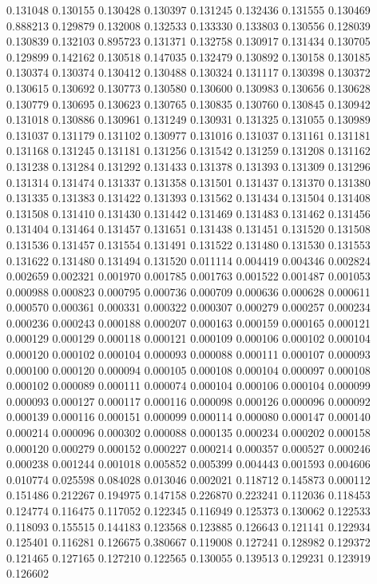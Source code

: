 0.131048
0.130155
0.130428
0.130397
0.131245
0.132436
0.131555
0.130469
0.888213
0.129879
0.132008
0.132533
0.133330
0.133803
0.130556
0.128039
0.130839
0.132103
0.895723
0.131371
0.132758
0.130917
0.131434
0.130705
0.129899
0.142162
0.130518
0.147035
0.132479
0.130892
0.130158
0.130185
0.130374
0.130374
0.130412
0.130488
0.130324
0.131117
0.130398
0.130372
0.130615
0.130692
0.130773
0.130580
0.130600
0.130983
0.130656
0.130628
0.130779
0.130695
0.130623
0.130765
0.130835
0.130760
0.130845
0.130942
0.131018
0.130886
0.130961
0.131249
0.130931
0.131325
0.131055
0.130989
0.131037
0.131179
0.131102
0.130977
0.131016
0.131037
0.131161
0.131181
0.131168
0.131245
0.131181
0.131256
0.131542
0.131259
0.131208
0.131162
0.131238
0.131284
0.131292
0.131433
0.131378
0.131393
0.131309
0.131296
0.131314
0.131474
0.131337
0.131358
0.131501
0.131437
0.131370
0.131380
0.131335
0.131383
0.131422
0.131393
0.131562
0.131434
0.131504
0.131408
0.131508
0.131410
0.131430
0.131442
0.131469
0.131483
0.131462
0.131456
0.131404
0.131464
0.131457
0.131651
0.131438
0.131451
0.131520
0.131508
0.131536
0.131457
0.131554
0.131491
0.131522
0.131480
0.131530
0.131553
0.131622
0.131480
0.131494
0.131520
0.011114
0.004419
0.004346
0.002824
0.002659
0.002321
0.001970
0.001785
0.001763
0.001522
0.001487
0.001053
0.000988
0.000823
0.000795
0.000736
0.000709
0.000636
0.000628
0.000611
0.000570
0.000361
0.000331
0.000322
0.000307
0.000279
0.000257
0.000234
0.000236
0.000243
0.000188
0.000207
0.000163
0.000159
0.000165
0.000121
0.000129
0.000129
0.000118
0.000121
0.000109
0.000106
0.000102
0.000104
0.000120
0.000102
0.000104
0.000093
0.000088
0.000111
0.000107
0.000093
0.000100
0.000120
0.000094
0.000105
0.000108
0.000104
0.000097
0.000108
0.000102
0.000089
0.000111
0.000074
0.000104
0.000106
0.000104
0.000099
0.000093
0.000127
0.000117
0.000116
0.000098
0.000126
0.000096
0.000092
0.000139
0.000116
0.000151
0.000099
0.000114
0.000080
0.000147
0.000140
0.000214
0.000096
0.000302
0.000088
0.000135
0.000234
0.000202
0.000158
0.000120
0.000279
0.000152
0.000227
0.000214
0.000357
0.000527
0.000246
0.000238
0.001244
0.001018
0.005852
0.005399
0.004443
0.001593
0.004606
0.010774
0.025598
0.084028
0.013046
0.002021
0.118712
0.145873
0.000112
0.151486
0.212267
0.194975
0.147158
0.226870
0.223241
0.112036
0.118453
0.124774
0.116475
0.117052
0.122345
0.116949
0.125373
0.130062
0.122533
0.118093
0.155515
0.144183
0.123568
0.123885
0.126643
0.121141
0.122934
0.125401
0.116281
0.126675
0.380667
0.119008
0.127241
0.128982
0.129372
0.121465
0.127165
0.127210
0.122565
0.130055
0.139513
0.129231
0.123919
0.126602
